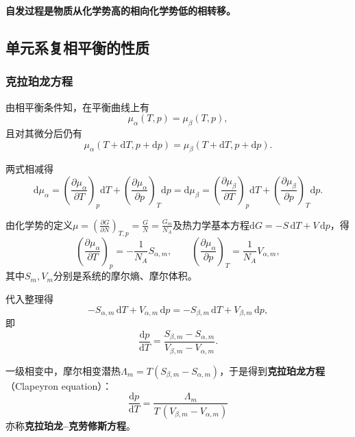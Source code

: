 \documentclass[UTF8]{ctexart}
\theoremstyle{definition}
\begin{document}
\textbf{自发过程是物质从化学势高的相向化学势低的相转移。}


\subsection{单元系复相平衡的性质}

\subsubsection*{克拉珀龙方程}

由相平衡条件知，在平衡曲线上有
\begin{equation}
\mu_\alpha(T,p)=\mu_\beta(T,p),
\end{equation}
且对其微分后仍有
\begin{equation}
\mu_\alpha(T+\mathrm{d}T,p+\mathrm{d}p)=\mu_\beta(T+\mathrm{d}T,p+\mathrm{d}p).
\end{equation}

两式相减得
\begin{equation}
\mathrm{d}\mu_\alpha
= \left(\frac{\partial\mu_\alpha}{\partial T}\right)_p\mathrm{d}T + \left(\frac{\partial\mu_\alpha}{\partial p}\right)_T\mathrm{d}p
= \mathrm{d}\mu_\beta
= \left(\frac{\partial\mu_\beta}{\partial T}\right)_p\mathrm{d}T + \left(\frac{\partial\mu_\beta}{\partial p}\right)_T\mathrm{d}p.
\end{equation}

由化学势的定义$\displaystyle\mu=\left(\frac{\partial G}{\partial N}\right)_{T,p}=\frac{G}{N}=\frac{G_m}{N_A}$及热力学基本方程$\mathrm{d}G=-S\,\mathrm{d}T+V\,\mathrm{d}p$，得
\begin{equation}
\left(\frac{\partial\mu_\alpha}{\partial T}\right)_p = -\frac{1}{N_A}S_{\alpha,m},\qquad
\left(\frac{\partial\mu_\alpha}{\partial p}\right)_T = \frac{1}{N_A}V_{\alpha,m},
\end{equation}
其中$S_m,V_m$分别是系统的摩尔熵、摩尔体积。

代入整理得
\begin{equation}
-S_{\alpha,m}\,\mathrm{d}T + V_{\alpha,m}\,\mathrm{d}p
= -S_{\beta,m}\,\mathrm{d}T + V_{\beta,m}\,\mathrm{d}p,
\end{equation}
即
\begin{equation}
\frac{\mathrm{d}p}{\mathrm{d}T}
= \frac{S_{\beta,m}-S_{\alpha,m}}{V_{\beta,m}-V_{\alpha,m}}.
\end{equation}

一级相变中，摩尔相变潜热$\Lambda_m=T(S_{\beta,m}-S_{\alpha,m})$，于是得到\textbf{克拉珀龙方程}（Clapeyron equation）：
\begin{equation}
\boxed{\frac{\mathrm{d}p}{\mathrm{d}T} = \frac{\Lambda_m}{T\,(V_{\beta,m}-V_{\alpha,m})}}
\end{equation}
亦称\textbf{克拉珀龙--克劳修斯方程}。
\end{document}
